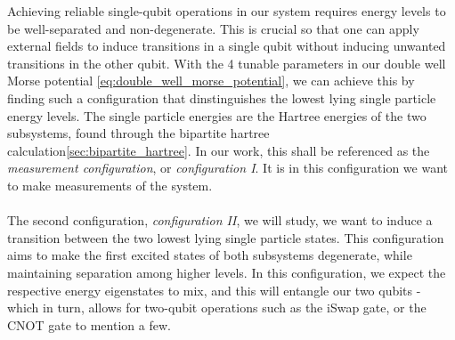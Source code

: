 \documentclass{subfiles}
\begin{document}
Achieving reliable single-qubit operations in our system requires energy levels to be well-separated and non-degenerate. This is crucial so that one can apply external fields to induce transitions in a single qubit without inducing unwanted transitions in the other qubit. With the 4 tunable parameters in our double well Morse potential \ref{eq:double_well_morse_potential}, we can achieve this by finding such a configuration that dinstinguishes the lowest lying single particle energy levels. The single particle energies are the Hartree energies of the two subsystems, found through the bipartite hartree calculation\ref{sec:bipartite_hartree}. In our work, this shall be referenced as the \emph{measurement configuration}, or \emph{configuration I}. It is in this configuration we want to make measurements of the system. 
\\ \\
The second configuration, \emph{configuration II}, we will study, we want to induce a transition between the two lowest lying single particle states. This configuration aims to make the first excited states of both subsystems degenerate, while maintaining separation among higher levels. In this configuration, we expect the respective energy eigenstates to mix, and this will entangle our two qubits - which in turn, allows for two-qubit operations such as the iSwap gate, or the CNOT gate to mention a few\cite{leinonen2024coulomb, nichol2017high}.
\end{document}
